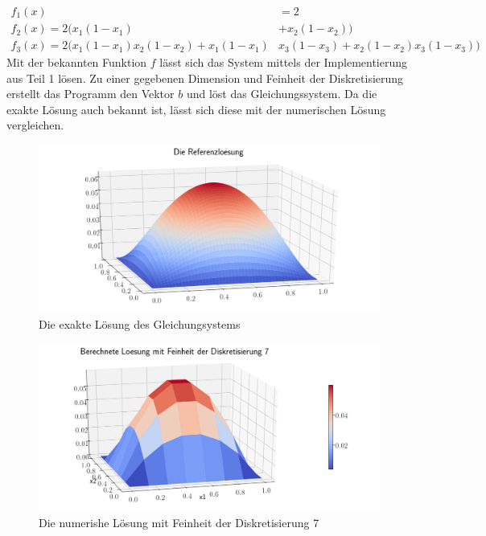\documentclass[smallheadings]{scrartcl}
\numberwithin{equation}{section}
\begin{document}
\begin{align}
f_1(x)&=2 \\
f_2(x) = 2(x_1(1-x_1)&+x_2(1-x_2)) \\
f_3(x)= 2(x_1(1-x_1)x_2(1-x_2)+x_1(1-x_1)&x_3(1-x_3)+x_2(1-x_2)x_3(1-x_3))
\end{align}
Mit der bekannten Funktion $f$ lässt sich das System mittels der Implementierung aus Teil 1 lösen. Zu einer gegebenen Dimension und Feinheit der Diskretisierung erstellt das Programm den Vektor $b$ und löst das Gleichungssystem. Da die exakte Lösung auch bekannt ist, lässt sich diese mit der numerischen Lösung vergleichen.

\begin{figure}
	\centering
	\includegraphics[width=\linewidth]{Bericht/Bilder2/referenz}
	\caption{Die exakte Lösung des Gleichungsystems}
	\label{fig:referenz}
\end{figure}

\begin{figure}
	\centering
	\includegraphics[width=\linewidth]{Bericht/Bilder2/3dlos7}
	\caption{Die numerishe Lösung mit Feinheit der Diskretisierung 7}
	\label{fig:3dlos7}
\end{figure}
\end{document}

